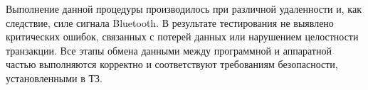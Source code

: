 \begin{singlespacing}
	\small
	\captionsetup{labelsep=endash, justification=raggedright, singlelinecheck=off}
	
\end{singlespacing}


Выполнение данной процедуры производилось при различной удаленности и, как следствие, силе сигнала Bluetooth.
В результате тестирования не выявлено критических ошибок, связанных с потерей данных или нарушением целостности транзакции.
Все этапы обмена данными между программной и аппаратной частью выполняются корректно и соответствуют требованиям безопасности, установленными в ТЗ.
